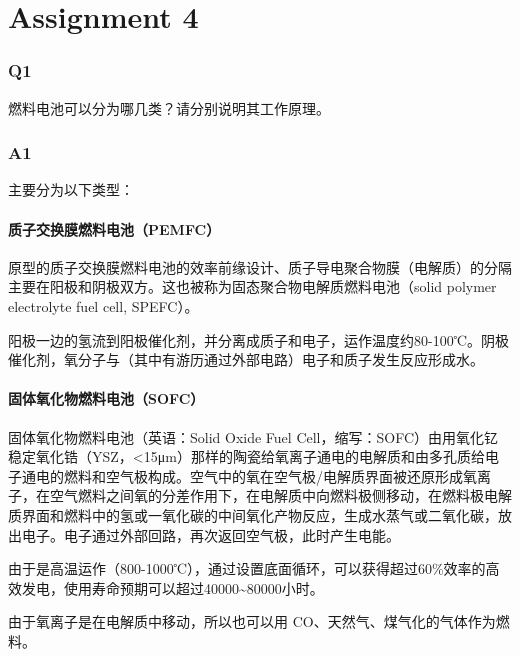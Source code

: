 \documentclass[
]{article}
\date{}
\begin{document}
\hypertarget{header-n0}{%
\section{Assignment 4}\label{header-n0}}

\hypertarget{header-n2}{%
\subsubsection{Q1}\label{header-n2}}

燃料电池可以分为哪几类？请分别说明其工作原理。

\hypertarget{header-n14}{%
\subsubsection{A1}\label{header-n14}}

主要分为以下类型：

\hypertarget{header-n19}{%
\paragraph{质子交换膜燃料电池（PEMFC）}\label{header-n19}}

原型的质子交换膜燃料电池的效率前缘设计、质子导电聚合物膜（电解质）的分隔主要在阳极和阴极双方。这也被称为固态聚合物电解质燃料电池（solid
polymer electrolyte fuel cell, SPEFC）。

阳极一边的氢流到阳极催化剂，并分离成质子和电子，运作温度约80-100℃。阴极催化剂，氧分子与（其中有游历通过外部电路）电子和质子发生反应形成水。

\hypertarget{header-n27}{%
\paragraph{固体氧化物燃料电池（SOFC）}\label{header-n27}}

固体氧化物燃料电池（英语：Solid Oxide Fuel
Cell，缩写：SOFC）由用氧化钇稳定氧化锆（YSZ，\textless15μm）那样的陶瓷给氧离子通电的电解质和由多孔质给电子通电的燃料和空气极构成。空气中的氧在空气极/电解质界面被还原形成氧离子，在空气燃料之间氧的分差作用下，在电解质中向燃料极侧移动，在燃料极电解质界面和燃料中的氢或一氧化碳的中间氧化产物反应，生成水蒸气或二氧化碳，放出电子。电子通过外部回路，再次返回空气极，此时产生电能。

由于是高温运作（800-1000℃），通过设置底面循环，可以获得超过60\%效率的高效发电，使用寿命预期可以超过40000\textasciitilde80000小时。

由于氧离子是在电解质中移动，所以也可以用
CO、天然气、煤气化的气体作为燃料。
\end{document}
